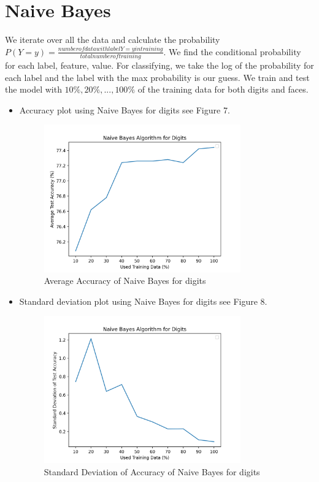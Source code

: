 \documentclass{article}
\begin{document}
\section*{Naive Bayes}
We iterate over all the data and calculate the probability $P(Y=y) = \frac{number of data with label Y = y in training}{total number of training}$. We find the conditional probability for each label, feature, value. For classifying, we take the log of the probability for each label and the label with the max probability is our guess. We train and test the model with $10\%, 20\%, ..., 100\%$ of the training data for both digits and faces.
\begin{itemize}
    \item Accuracy plot using Naive Bayes for digits see Figure 7.
    \begin{figure}
        \centering
        \includegraphics[width=0.8\textwidth]{nbDi.png}
        \caption{Average Accuracy of Naive Bayes for digits}
    \end{figure}
    
    \item Standard deviation plot using Naive Bayes for digits see Figure 8.
    \begin{figure}
        \centering
        \includegraphics[width=0.8\textwidth]{nbDiSd.png}
        \caption{Standard Deviation of Accuracy of Naive Bayes for digits}
    \end{figure}


\end{itemize}
\end{document}
